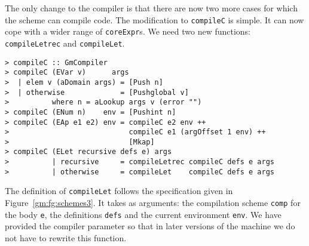 The only change to the compiler is that there are now two more cases for which
the \tC{} scheme can compile code. The modification to \mbox{\tt compileC} is simple.
It can now cope with a wider range of \mbox{\tt coreExpr}s. We need two new functions:
\mbox{\tt compileLetrec} and \mbox{\tt compileLet}.
\begin{verbatim}
> compileC :: GmCompiler
> compileC (EVar v)      args 
>  | elem v (aDomain args) = [Push n]
>  | otherwise             = [Pushglobal v]
>          where n = aLookup args v (error "")
> compileC (ENum n)    env = [Pushint n]
> compileC (EAp e1 e2) env = compileC e2 env ++
>                            compileC e1 (argOffset 1 env) ++
>                            [Mkap]
> compileC (ELet recursive defs e) args 
>          | recursive     = compileLetrec compileC defs e args
>          | otherwise     = compileLet    compileC defs e args
\end{verbatim}
%
%
%
%
%
\par
The definition of \mbox{\tt compileLet} follows the specification given in
Figure~\ref{gm:fg:schemes3}. It takes as arguments: the compilation
scheme \mbox{\tt comp} for the body \mbox{\tt e}, the definitions \mbox{\tt defs} and the current
environment \mbox{\tt env}. We have provided the compiler parameter so that in
later versions of the machine we do not have to rewrite this function.
